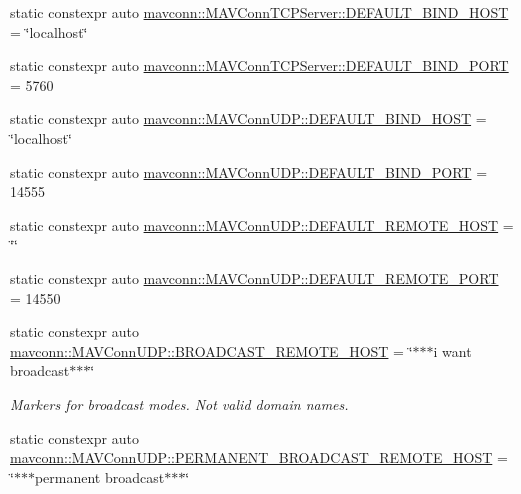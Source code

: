 \begin{DoxyCompactItemize}
static constexpr auto \mbox{\hyperlink{group__mavconn_gae043843ee4b947094ca58342c442c3b6}{mavconn\+::\+M\+A\+V\+Conn\+T\+C\+P\+Server\+::\+D\+E\+F\+A\+U\+L\+T\+\_\+\+B\+I\+N\+D\+\_\+\+H\+O\+ST}} = \char`\"{}localhost\char`\"{}
\item 
static constexpr auto \mbox{\hyperlink{group__mavconn_gacf9d47d0f198105f4a27c9668ba793b1}{mavconn\+::\+M\+A\+V\+Conn\+T\+C\+P\+Server\+::\+D\+E\+F\+A\+U\+L\+T\+\_\+\+B\+I\+N\+D\+\_\+\+P\+O\+RT}} = 5760
\item 
static constexpr auto \mbox{\hyperlink{group__mavconn_ga62467db7651e86bb5428c4288356f813}{mavconn\+::\+M\+A\+V\+Conn\+U\+D\+P\+::\+D\+E\+F\+A\+U\+L\+T\+\_\+\+B\+I\+N\+D\+\_\+\+H\+O\+ST}} = \char`\"{}localhost\char`\"{}
\item 
static constexpr auto \mbox{\hyperlink{group__mavconn_ga330f03ed06a3e027ec7be74426dc646b}{mavconn\+::\+M\+A\+V\+Conn\+U\+D\+P\+::\+D\+E\+F\+A\+U\+L\+T\+\_\+\+B\+I\+N\+D\+\_\+\+P\+O\+RT}} = 14555
\item 
static constexpr auto \mbox{\hyperlink{group__mavconn_ga7a03f4b69e2791a742717516b6421466}{mavconn\+::\+M\+A\+V\+Conn\+U\+D\+P\+::\+D\+E\+F\+A\+U\+L\+T\+\_\+\+R\+E\+M\+O\+T\+E\+\_\+\+H\+O\+ST}} = \char`\"{}\char`\"{}
\item 
static constexpr auto \mbox{\hyperlink{group__mavconn_ga25daeb4235691fdf52da1551bf93bc88}{mavconn\+::\+M\+A\+V\+Conn\+U\+D\+P\+::\+D\+E\+F\+A\+U\+L\+T\+\_\+\+R\+E\+M\+O\+T\+E\+\_\+\+P\+O\+RT}} = 14550
\item 
static constexpr auto \mbox{\hyperlink{group__mavconn_gae78adaaf99172a7aafead43dc2883cec}{mavconn\+::\+M\+A\+V\+Conn\+U\+D\+P\+::\+B\+R\+O\+A\+D\+C\+A\+S\+T\+\_\+\+R\+E\+M\+O\+T\+E\+\_\+\+H\+O\+ST}} = \char`\"{}$\ast$$\ast$$\ast$i want broadcast$\ast$$\ast$$\ast$\char`\"{}
\begin{DoxyCompactList}\small\item\em Markers for broadcast modes. Not valid domain names. \end{DoxyCompactList}\item 
static constexpr auto \mbox{\hyperlink{group__mavconn_gab9cc9895e36eefd3cd6e6fc7d4895c6f}{mavconn\+::\+M\+A\+V\+Conn\+U\+D\+P\+::\+P\+E\+R\+M\+A\+N\+E\+N\+T\+\_\+\+B\+R\+O\+A\+D\+C\+A\+S\+T\+\_\+\+R\+E\+M\+O\+T\+E\+\_\+\+H\+O\+ST}} = \char`\"{}$\ast$$\ast$$\ast$permanent broadcast$\ast$$\ast$$\ast$\char`\"{}
\end{DoxyCompactItemize}
